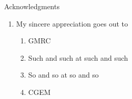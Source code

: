 \documentclass[dark]{cgem-presentation}
\begin{document}
  \begin{frame}{Acknowledgments}
    \vspace{-2cm}
    \begin{enumerate}
      \item My sincere appreciation goes out to
      \begin{enumerate}
        \item GMRC
        \item Such and such at such and such
        \item So and so at so and so
        \item CGEM 
      \end{enumerate}
    \end{enumerate}
  \end{frame}

\end{document}

